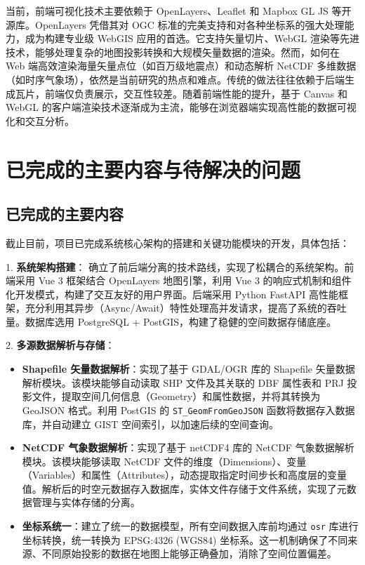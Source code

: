 \documentclass[a4paper,12pt]{ctexart}
\begin{document}
当前，前端可视化技术主要依赖于 OpenLayers、Leaflet 和 Mapbox GL JS 等开源库。OpenLayers 凭借其对 OGC 标准的完美支持和对各种坐标系的强大处理能力，成为构建专业级 WebGIS 应用的首选。它支持矢量切片、WebGL 渲染等先进技术，能够处理复杂的地图投影转换和大规模矢量数据的渲染。然而，如何在 Web 端高效渲染海量矢量点位（如百万级地震点）和动态解析 NetCDF 多维数据（如时序气象场），依然是当前研究的热点和难点。传统的做法往往依赖于后端生成瓦片，前端仅负责展示，交互性较差。随着前端性能的提升，基于 Canvas 和 WebGL 的客户端渲染技术逐渐成为主流，能够在浏览器端实现高性能的数据可视化和交互分析。

\section{已完成的主要内容与待解决的问题}

\subsection{已完成的主要内容}

截止目前，项目已完成系统核心架构的搭建和关键功能模块的开发，具体包括：

1. \textbf{系统架构搭建}：
   确立了前后端分离的技术路线，实现了松耦合的系统架构。前端采用 Vue 3 框架结合 OpenLayers 地图引擎，利用 Vue 3 的响应式机制和组件化开发模式，构建了交互友好的用户界面。后端采用 Python FastAPI 高性能框架，充分利用其异步（Async/Await）特性处理高并发请求，提高了系统的吞吐量。数据库选用 PostgreSQL + PostGIS，构建了稳健的空间数据存储底座。

2. \textbf{多源数据解析与存储}：
   \begin{itemize}
       \item \textbf{Shapefile 矢量数据解析}：实现了基于 GDAL/OGR 库的 Shapefile 矢量数据解析模块。该模块能够自动读取 SHP 文件及其关联的 DBF 属性表和 PRJ 投影文件，提取空间几何信息（Geometry）和属性数据，并将其转换为 GeoJSON 格式。利用 PostGIS 的 \texttt{ST\_GeomFromGeoJSON} 函数将数据存入数据库，并自动建立 GIST 空间索引，以加速后续的空间查询。
       \item \textbf{NetCDF 气象数据解析}：实现了基于 netCDF4 库的 NetCDF 气象数据解析模块。该模块能够读取 NetCDF 文件的维度（Dimensions）、变量（Variables）和属性（Attributes），动态提取指定时间步长和高度层的变量值。解析后的时空元数据存入数据库，实体文件存储于文件系统，实现了元数据管理与实体存储的分离。
       \item \textbf{坐标系统一}：建立了统一的数据模型，所有空间数据入库前均通过 \texttt{osr} 库进行坐标转换，统一转换为 EPSG:4326 (WGS84) 坐标系。这一机制确保了不同来源、不同原始投影的数据在地图上能够正确叠加，消除了空间位置偏差。
   \end{itemize}
\end{document}
